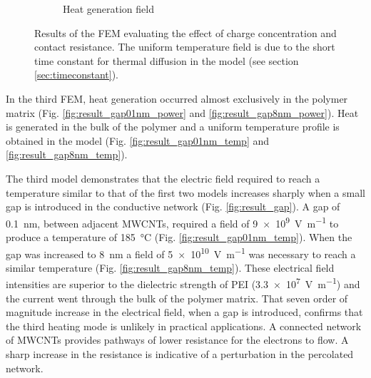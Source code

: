 \documentclass[11pt,review,times]{article}
\begin{document}
\begin{figure}[htb]
\begin{subfigure}{0.49\textwidth}
		\caption{Heat generation field}
		\label{fig:heat_3D}
	\end{subfigure}
	\caption{Results of the FEM evaluating the effect of charge concentration and contact resistance. The uniform temperature field is due to the short time constant for thermal diffusion in the model (see section \ref{sec:timeconstant}).}
	\label{fig:results_3D}
\end{figure}

\FloatBarrier

In the third FEM, heat generation occurred almost exclusively in the polymer matrix (Fig. \ref{fig:result_gap01nm_power} and \ref{fig:result_gap8nm_power}). 
Heat is generated in the bulk of the polymer and a uniform temperature profile is obtained in the model (Fig. \ref{fig:result_gap01nm_temp} and \ref{fig:result_gap8nm_temp}). 

The third model demonstrates that the electric field required to reach a temperature similar to that of the first two models increases sharply when a small gap is introduced in the conductive network (Fig. \ref{fig:result_gap}). 
A gap of \SI{0.1}{\nano\metre}, between adjacent MWCNTs, required a field of \SI{9e9}{\volt\per\metre} to produce a temperature of \SI{185}{\celsius} (Fig. \ref{fig:result_gap01nm_temp}). 
When the gap was increased to \SI{8}{\nano\metre} a field of \SI{5e10}{\volt\per\metre} was necessary to reach a similar temperature (Fig. \ref{fig:result_gap8nm_temp}). 
These electrical field intensities are superior to the dielectric strength of PEI (\SI{3.3e7}{\volt\per\metre}) and the current went through the bulk of the polymer matrix. 
That seven order of magnitude increase in the electrical field, when a gap is introduced, confirms that the third heating mode is unlikely in practical applications. 
A connected network of MWCNTs provides pathways of lower resistance for the electrons to flow. 
A sharp increase in the resistance is indicative of a perturbation in the percolated network. 
\end{document}
